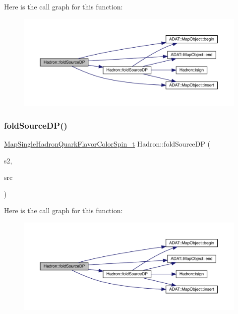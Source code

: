 Here is the call graph for this function\+:
\nopagebreak
\begin{figure}[H]
\begin{center}
\leavevmode
\includegraphics[width=350pt]{d1/daf/namespaceHadron_af80d375e34002f168b53c74370f8dd3a_cgraph}
\end{center}
\end{figure}
\mbox{\label{namespaceHadron_a273b8ceda53ab61615d67cead7c42d94}} 
\subsubsection{\texorpdfstring{foldSourceDP()}{foldSourceDP()}\hspace{0.1cm}{\footnotesize\ttfamily [7/7]}}
{\footnotesize\ttfamily \mbox{\hyperlink{namespaceHadron_a03b319764f85c20434f20a269ce5f388}{Map\+Single\+Hadron\+Quark\+Flavor\+Color\+Spin\+\_\+t}} Hadron\+::fold\+Source\+DP (\begin{DoxyParamCaption}\item[{const \mbox{\hyperlink{namespaceHadron_a03b319764f85c20434f20a269ce5f388}{Map\+Single\+Hadron\+Quark\+Flavor\+Color\+Spin\+\_\+t}} \&}]{s2,  }\item[{bool}]{src }\end{DoxyParamCaption})}

Here is the call graph for this function\+:
\nopagebreak
\begin{figure}[H]
\begin{center}
\leavevmode
\includegraphics[width=350pt]{d1/daf/namespaceHadron_a273b8ceda53ab61615d67cead7c42d94_cgraph}
\end{center}
\end{figure}
\mbox{\label{namespaceHadron_aa0ad60c011c7668c5389ce9286b3c8dd}} 
